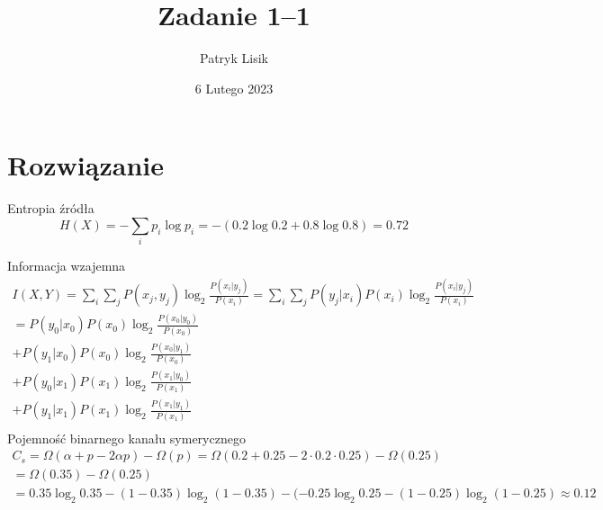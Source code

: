 \documentclass[12pt]{article}
\title{Zadanie 1--1}
\author{Patryk Lisik}
\date{\(6\) Lutego  2023}
\begin{document}
    \maketitle
    \renewcommand{\abstractname}{Treść}

    \begin{abstract}
    \end{abstract}


    \section*{Rozwiązanie}

    Entropia źródła
    \begin{equation*}
        H(X) = -\sum_i p_i \log p_i = -(0.2 \log 0.2 + 0.8 \log 0.8) = 0.72
    \end{equation*}

    Informacja wzajemna
    \begin{multline*}
        I(X,Y)  = \sum_{i}\sum_j P(x_j,y_j)\log_2 \frac{P(x_i|y_j)}{P(x_i)}
        = \sum_{i}\sum_j P(y_j|x_i)P(x_i)\log_2 \frac{P(x_i|y_j)}{P(x_i)} \\
        = P(y_0|x_0)P(x_0)\log_2 \frac{P(x_0|y_0)}{P(x_0)} \\
        + P(y_1|x_0)P(x_0)\log_2 \frac{P(x_0|y_1)}{P(x_0)} \\
        + P(y_0|x_1)P(x_1)\log_2 \frac{P(x_1|y_0)}{P(x_1)} \\
        + P(y_1|x_1)P(x_1)\log_2 \frac{P(x_1|y_1)}{P(x_1)} \\
    \end{multline*}
Pojemność binarnego kanału symerycznego
    \begin{multline*}
    C_s = \Omega(\alpha + p - 2\alpha p) - \Omega (p) = \Omega(0.2+0.25 - 2 \cdot 0.2 \cdot 0.25)-\Omega(0.25) \\
        = \Omega(0.35)-\Omega(0.25) \\
        = 0.35 \log_2 0.35 - (1-0.35) \log_2(1-0.35) -(-0.25\log_2 0.25 - (1-0.25)\log_2(1-0.25) \approx 0.12 
\end{multline*}
    
\end{document}
